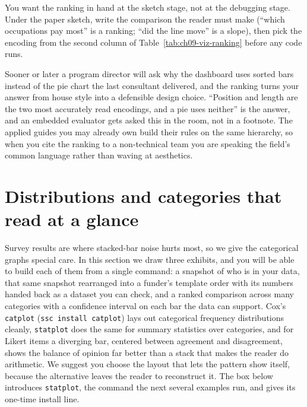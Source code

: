 \documentclass[
    a4paper,
    fontsize=10pt,
    twoside=true,
    numbers=noenddot,
]{kaobook}
\begin{document}
You want the ranking in hand at the sketch stage, not at the debugging stage. Under the paper sketch, write the comparison the reader must make (\enquote{which occupations pay most} is a ranking; \enquote{did the line move} is a slope), then pick the encoding from the second column of Table~\ref{tab:ch09-viz-ranking} before any code runs.

Sooner or later a program director will ask why the dashboard uses sorted bars instead of the pie chart the last consultant delivered, and the ranking turns your answer from house style into a defensible design choice. \enquote{Position and length are the two most accurately read encodings, and a pie uses neither} is the answer, and an embedded evaluator gets asked this in the room, not in a footnote. The applied guides you may already own build their rules on the same hierarchy, so when you cite the ranking to a non-technical team you are speaking the field's common language rather than waving at aesthetics.

\section{Distributions and categories that read at a glance}
Survey results are where stacked-bar noise hurts most, so we give the categorical graphs special care. In this section we draw three exhibits, and you will be able to build each of them from a single command: a snapshot of who is in your data, that same snapshot rearranged into a funder's template order with its numbers handed back as a dataset you can check, and a ranked comparison across many categories with a confidence interval on each bar the data can support. Cox's \texttt{catplot} (\texttt{ssc install catplot}) lays out categorical frequency distributions cleanly, \texttt{statplot} does the same for summary statistics over categories, and for Likert items a diverging bar, centered between agreement and disagreement, shows the balance of opinion far better than a stack that makes the reader do arithmetic. We suggest you choose the layout that lets the pattern show itself, because the alternative leaves the reader to reconstruct it. The box below introduces \texttt{statplot}, the command the next several examples run, and gives its one-time install line.
\end{document}
